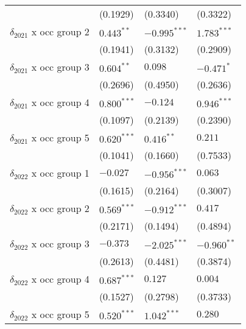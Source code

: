 \begin{tabular}{llll}
                                         &           (0.1929) &           (0.3340) &           (0.3322) \\
$\delta_{2021}$ x occ group 2            &       $0.443^{**}$ &     $-0.995^{***}$ &      $1.783^{***}$ \\
                                         &           (0.1941) &           (0.3132) &           (0.2909) \\
$\delta_{2021}$ x occ group 3            &       $0.604^{**}$ &            $0.098$ &         $-0.471^*$ \\
                                         &           (0.2696) &           (0.4950) &           (0.2636) \\
$\delta_{2021}$ x occ group 4            &      $0.800^{***}$ &           $-0.124$ &      $0.946^{***}$ \\
                                         &           (0.1097) &           (0.2139) &           (0.2390) \\
$\delta_{2021}$ x occ group 5            &      $0.620^{***}$ &       $0.416^{**}$ &            $0.211$ \\
                                         &           (0.1041) &           (0.1660) &           (0.7533) \\
$\delta_{2022}$ x occ group 1            &           $-0.027$ &     $-0.956^{***}$ &            $0.063$ \\
                                         &           (0.1615) &           (0.2164) &           (0.3007) \\
$\delta_{2022}$ x occ group 2            &      $0.569^{***}$ &     $-0.912^{***}$ &            $0.417$ \\
                                         &           (0.2171) &           (0.1494) &           (0.4894) \\
$\delta_{2022}$ x occ group 3            &           $-0.373$ &     $-2.025^{***}$ &      $-0.960^{**}$ \\
                                         &           (0.2613) &           (0.4481) &           (0.3874) \\
$\delta_{2022}$ x occ group 4            &      $0.687^{***}$ &            $0.127$ &            $0.004$ \\
                                         &           (0.1527) &           (0.2798) &           (0.3733) \\
$\delta_{2022}$ x occ group 5            &      $0.520^{***}$ &      $1.042^{***}$ &            $0.280$ \\

\end{tabular}
